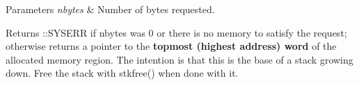 \begin{DoxyParams}{Parameters}
{\em nbytes} & Number of bytes requested.\\
\hline
\end{DoxyParams}
\begin{DoxyReturn}{Returns}
\-::\-S\-Y\-S\-E\-R\-R if {\ttfamily nbytes} was 0 or there is no memory to satisfy the request; otherwise returns a pointer to the {\bfseries topmost (highest address) word} of the allocated memory region. The intention is that this is the base of a stack growing down. Free the stack with stkfree() when done with it. 
\end{DoxyReturn}
